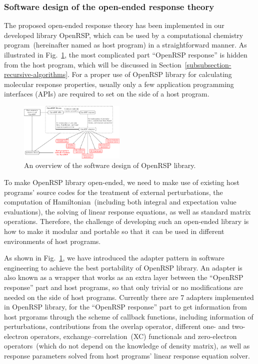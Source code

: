 \documentclass[%
 reprint,
 amsmath,amssymb,
 aps,
]{revtex4-1}
\begin{document}
\subsubsection{Software design of the open-ended response theory}

The proposed open-ended response theory has been implemented in our developed
library OpenRSP, which can be used by a computational chemistry
program~(hereinafter named as host program) in a straightforward manner. As
illustrated in Fig.~\ref{fig-openrsp-design}, the most complicated part
``OpenRSP response'' is hidden from the host program, which will be discussed
in Section~\ref{subsubsection-recursive-algorithms}. For a proper use of
OpenRSP library for calculating molecular response properties, usually only a
few application programming interfaces (APIs) are required to set on the side
of a host program.

\begin{figure}[hbt]
  \centering
  \includegraphics[width=0.45\textwidth]{openrsp_design.pdf}
  \caption{An overview of the software design of OpenRSP library.}
  \label{fig-openrsp-design}
\end{figure}

To make OpenRSP library open-ended, we need to make use of existing host
programs' source codes for the treatment of external perturbations, the
computation of Hamiltonian~(including both integral and expectation value
evaluations), the solving of linear response equations, as well as standard
matrix operations. Therefore, the challenge of developing such an open-ended
library is how to make it modular and portable so that it can be used in
different environments of host programs.

As shown in Fig.~\ref{fig-openrsp-design}, we have introduced the adapter
pattern in software engineering to achieve the best portability of OpenRSP
library. An adapter is also known as a wrapper that works as an extra layer
between the ``OpenRSP response'' part and host programs, so that only trivial
or no modifications are needed on the side of host programs.  Currently there
are 7 adapters implemented in OpenRSP library, for the ``OpenRSP response''
part to get information from host prgorams through the scheme of callback
functions, including information of perturbations, contributions from the
overlap operator, different one- and two-electron operators,
exchange--correlation~(XC) functionals and zero-electron operators~(which do
not depend on the knowledge of density matrix), as well as response parameters
solved from host programs' linear response equation solver.
\end{document}
